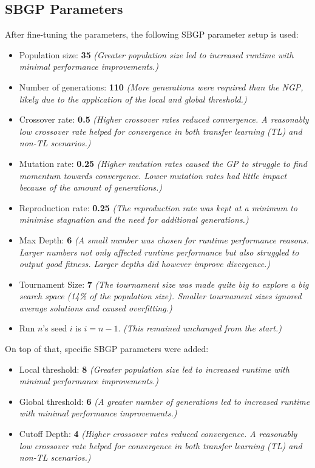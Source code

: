 \documentclass{article}
\begin{document}
\subsection{SBGP Parameters}
After fine-tuning the parameters, the following SBGP parameter setup is used:
\begin{itemize}
  \item Population size: \textbf{35} \emph{(Greater population size led to increased runtime with minimal performance improvements.)}
  \item Number of generations: \textbf{110} \emph{(More generations were required than the NGP, likely due to the application of the local and global threshold.)}
  \item Crossover rate: \textbf{0.5} \emph{(Higher crossover rates reduced convergence. A reasonably low crossover rate helped for convergence in both transfer learning (TL) and non-TL scenarios.)}
  \item Mutation rate: \textbf{0.25} \emph{(Higher mutation rates caused the GP to struggle to find momentum towards convergence. Lower mutation rates had little impact because of the amount of generations.)}
  \item Reproduction rate: \textbf{0.25 }\emph{(The reproduction rate was kept at a minimum to minimise stagnation and the need for additional generations.)}
  \item Max Depth: \textbf{6} \emph{(A small number was chosen for runtime performance reasons. Larger numbers not only affected runtime performance but also struggled to output good fitness. Larger depths did however improve divergence.)} 
  \item Tournament Size: \textbf{7} \emph{(The tournament size was made quite big to explore a big search space (14\% of the population size). Smaller tournament sizes ignored average solutions and caused overfitting.)}
  \item Run \(n\)'s seed \(i\) is \(i = n-1\). \emph{(This remained unchanged from the start.)}
\end{itemize}
On top of that, specific SBGP parameters were added:
\begin{itemize}
  \item Local threshold: \textbf{8} \emph{(Greater population size led to increased runtime with minimal performance improvements.)}
  \item Global threshold: \textbf{6} \emph{(A greater number of generations led to increased runtime with minimal performance improvements.)}
  \item Cutoff Depth: \textbf{4} \emph{(Higher crossover rates reduced convergence. A reasonably low crossover rate helped for convergence in both transfer learning (TL) and non-TL scenarios.)}
\end{itemize}
\end{document}
